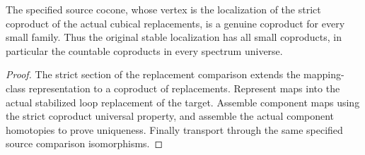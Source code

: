 \begin{proposition}
  \label{prop:actual-source-small-coproducts}
  \leanok
  The specified source cocone, whose vertex is the localization of the strict coproduct of the actual cubical replacements, is a genuine coproduct for every small family. Thus the original stable localization has all small coproducts, in particular the countable coproducts in every spectrum universe.
\end{proposition}
\begin{proof}
  The strict section of the replacement comparison extends the mapping-class representation to a coproduct of replacements. Represent maps into the actual stabilized loop replacement of the target. Assemble component maps using the strict coproduct universal property, and assemble the actual component homotopies to prove uniqueness. Finally transport through the same specified source comparison isomorphisms.
  \leanok
\end{proof}

